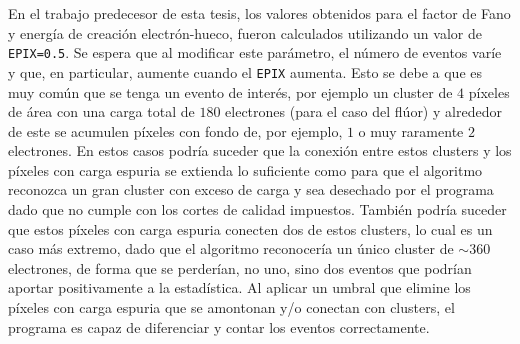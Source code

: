 En el trabajo predecesor de esta tesis\cite{TesisKevin}, los valores obtenidos para el factor de Fano y energía de creación electrón-hueco, fueron calculados utilizando un valor de \verb|EPIX=0.5|. Se espera que al modificar este parámetro, el número de eventos varíe y que, en particular, aumente cuando el \verb|EPIX| aumenta. Esto se debe a que es muy común que se tenga un evento de interés, por ejemplo un cluster de $4$ píxeles de área con una carga total de $180$ electrones (para el caso del flúor) y alrededor de este se acumulen píxeles con fondo de, por ejemplo, $1$ o muy raramente $2$ electrones. En estos casos podría suceder que la conexión entre estos clusters y los píxeles con carga espuria se extienda lo suficiente como para que el algoritmo reconozca un gran cluster con exceso de carga y sea desechado por el programa dado que no cumple con los cortes de calidad impuestos. También podría suceder que estos píxeles con carga espuria conecten dos de estos clusters, lo cual es un caso más extremo, dado que el algoritmo reconocería un único cluster de $\sim 360$ electrones, de forma que se perderían, no uno, sino dos eventos que podrían aportar positivamente a la estadística. Al aplicar un umbral que elimine los píxeles con carga espuria que se amontonan y/o conectan con clusters, el programa es capaz de diferenciar y contar los eventos correctamente.

